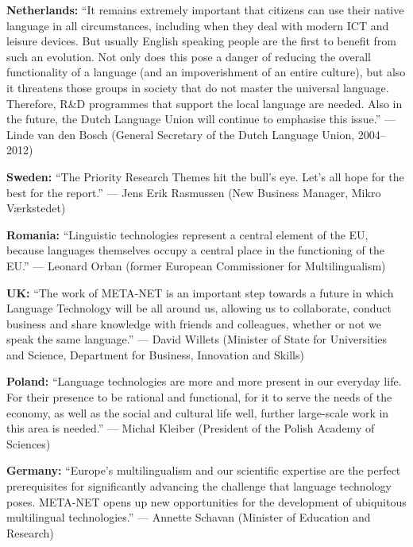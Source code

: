 \documentclass[10pt, plain]{../../metanetpaper}
\begin{document}
\medskip \textbf{Netherlands:} ``It remains extremely important that citizens can use their native language in all circumstances, including when they deal with modern ICT and leisure devices.  But usually English speaking people are the first to benefit from such an evolution.  Not only does this pose a danger of reducing the overall functionality of a language (and an impoverishment of an entire culture), but also it threatens those groups in society that do not master the universal language. Therefore, R\&D programmes that support the local language are needed. Also in the future, the Dutch Language Union will continue to emphasise this issue.'' --- Linde van den Bosch (General Secretary of the Dutch Language Union, 2004--2012)

\medskip \textbf{Sweden:} ``The Priority Research Themes hit the bull's eye. Let's all hope for the best for the report.'' --- Jens Erik Rasmussen (New Business Manager, Mikro Værkstedet)

\medskip \textbf{Romania:} ``Linguistic technologies represent a central element of the EU, because languages themselves occupy a central place in the functioning of the EU.'' --- Leonard Orban (former European Commissioner for Multilingualism)

\medskip \textbf{UK:} ``The work of META-NET is an important step towards a future in which Language Technology will be all around us, allowing us to collaborate, conduct business and share knowledge with friends and colleagues, whether or not we speak the same language.'' --- David Willets (Minister of State for Universities and Science, Department for Business, Innovation and Skills)

\medskip \textbf{Poland:} ``Language technologies are more and more present in our everyday life. For their presence to be rational and functional, for it to serve the needs of the economy, as well as the social and cultural life well, further large-scale work in this area is needed.'' --- Michał Kleiber (President of the Polish Academy of Sciences)

\medskip \textbf{Germany:} ``Europe's multilingualism and our scientific expertise are the perfect prerequisites for significantly advancing the challenge that language technology poses. META-NET opens up new opportunities for the development of ubiquitous multilingual technologies.'' --- Annette Schavan (Minister of Education and Research)

\end{document}
